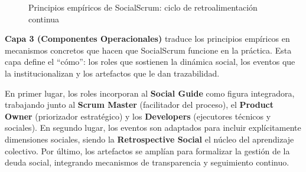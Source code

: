 \begin{figure}[!htbp]
    \caption{Principios empíricos de SocialScrum: ciclo de retroalimentación continua}
    \label{fig:principios_empiricos}
\end{figure}

\FloatBarrier

\textbf{Capa 3 (Componentes Operacionales)} traduce los principios empíricos en mecanismos concretos que hacen que SocialScrum funcione en la práctica.
Esta capa define el ``cómo'': los roles que sostienen la dinámica social, los eventos que la institucionalizan y los artefactos que le dan trazabilidad.

En primer lugar, los roles incorporan al \textbf{Social Guide} como figura integradora, trabajando junto al \textbf{Scrum Master} (facilitador del proceso), el \textbf{Product Owner} (priorizador estratégico) y los \textbf{Developers} (ejecutores técnicos y sociales).
En segundo lugar, los eventos son adaptados para incluir explícitamente dimensiones sociales, siendo la \textbf{Retrospective Social} el núcleo del aprendizaje colectivo.
Por último, los artefactos se amplían para formalizar la gestión de la deuda social, integrando mecanismos de transparencia y seguimiento continuo.

